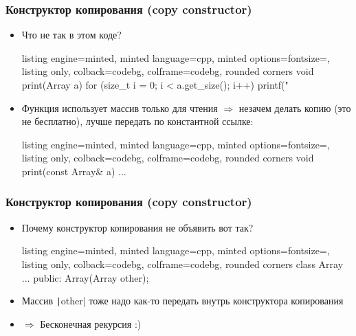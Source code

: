 \documentclass[10pt]{beamer}
\begin{document}
\begin{frame}[fragile]
\frametitle{Конструктор копирования (copy constructor)}
\begin{itemize}
\item Что не так в этом коде?
\begin{tcblisting}{listing engine=minted, minted language=cpp, minted options={fontsize=\scriptsize}, listing only, colback=codebg, colframe=codebg, rounded corners}
void print(Array a) {
  for (size_t i = 0; i < a.get_size(); i++) {
    printf("%
  }
}
\end{tcblisting}
\pause
\item Функция использует массив только для чтения \(\Longrightarrow\) незачем делать копию (это не бесплатно), лучше передать по константной ссылке:
\begin{tcblisting}{listing engine=minted, minted language=cpp, minted options={fontsize=\scriptsize}, listing only, colback=codebg, colframe=codebg, rounded corners}
void print(const Array& a) {
  ...
}
\end{tcblisting}
\end{itemize}
\end{frame}

\begin{frame}[fragile]
\frametitle{Конструктор копирования (copy constructor)}
\begin{itemize}
\item Почему конструктор копирования не объявить вот так?
\begin{tcblisting}{listing engine=minted, minted language=cpp, minted options={fontsize=\scriptsize}, listing only, colback=codebg, colframe=codebg, rounded corners}
class Array {
  ...
public:
  Array(Array other);
}
\end{tcblisting}
\pause
{}
\item Массив \texttt|other| тоже надо как-то передать внутрь конструктора копирования
\pause
\item \(\Longrightarrow\) Бесконечная рекурсия :)
\end{itemize}
\end{frame}
\end{document}
